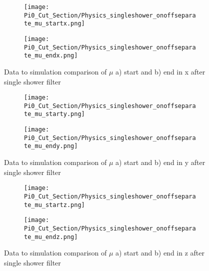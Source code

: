\begin{figure}[H]
\centering
  \begin{subfigure}[t]{0.3\textwidth}
    \centering
\texttt{[image: Pi0\_Cut\_Section/Physics\_singleshower\_onoffseparate\_mu\_startx.png]}
  \caption{ }
  \end{subfigure} 
  \hspace{30mm}
  \begin{subfigure}[t]{0.3\textwidth}
    \centering
\texttt{[image: Pi0\_Cut\_Section/Physics\_singleshower\_onoffseparate\_mu\_endx.png]}
  \caption{ }
  \end{subfigure} 
\caption{ Data to simulation comparison of $\mu$ a) start and b) end in x after single shower filter }
\label{fig:physics_singleshower_x}
\end{figure}

\begin{figure}[H]
\centering
  \begin{subfigure}[t]{0.3\textwidth}
    \centering
\texttt{[image: Pi0\_Cut\_Section/Physics\_singleshower\_onoffseparate\_mu\_starty.png]}
  \caption{ }
  \end{subfigure} 
  \hspace{30mm}
  \begin{subfigure}[t]{0.3\textwidth}
    \centering
\texttt{[image: Pi0\_Cut\_Section/Physics\_singleshower\_onoffseparate\_mu\_endy.png]}
  \caption{ }
  \end{subfigure} 
\caption{ Data to simulation comparison of $\mu$ a) start and b) end in y after single shower filter }
\label{fig:physics_singleshower_y}
\end{figure}

\begin{figure}[H]
\centering
  \begin{subfigure}[t]{0.3\textwidth}
    \centering
\texttt{[image: Pi0\_Cut\_Section/Physics\_singleshower\_onoffseparate\_mu\_startz.png]}
  \caption{ }
  \end{subfigure} 
  \hspace{30mm}
  \begin{subfigure}[t]{0.3\textwidth}
    \centering
\texttt{[image: Pi0\_Cut\_Section/Physics\_singleshower\_onoffseparate\_mu\_endz.png]}
  \caption{ }
  \end{subfigure} 
\caption{ Data to simulation comparison of $\mu$ a) start and b) end in z after single shower filter }
\label{fig:physics_singleshower_z}
\end{figure}

